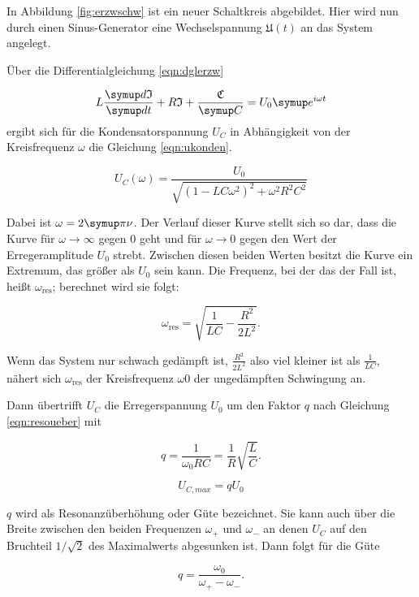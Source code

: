 In Abbildung \ref{fig:erzwschw} ist ein neuer Schaltkreis abgebildet. Hier
wird nun durch einen Sinus-Generator eine Wechselspannung  $\mathfrak{U}(t)$
an das System angelegt.

Über die Differentialgleichung \eqref{eqn:dglerzw}

\begin{equation}
  L\frac{\g{d}\mathfrak{I}}{\g{dt}} + R\mathfrak{I} + \frac{\mathfrak{C}}{\g{C}}
   = U_{\text{0}}\g{e}^{i\omega t}
  \label{eqn:dglerzw}
\end{equation}
ergibt sich für die Kondensatorspannung $U_C$ in Abhängigkeit von der
Kreisfrequenz $\omega$ die Gleichung \eqref{eqn:ukonden}.

\begin{equation}
  U_C(\omega) = \frac{U_\text{0}}{\sqrt{(1 - LC\omega^2)^2 + \omega^2
  R^2C^2}}
  \label{eqn:ukonden}
\end{equation}

Dabei ist $\omega = 2 \g{\pi} \nu$. Der Verlauf dieser Kurve stellt sich
so dar, dass die Kurve für $\omega \to \infty$ gegen 0 geht und für
$\omega \to 0$ gegen den Wert der Erregeramplitude $U_0$ strebt.
Zwischen diesen beiden Werten besitzt die Kurve ein Extremum, das
größer als $U_0$ sein kann. Die Frequenz, bei der das der Fall ist,
heißt $\omega_{\text{res}}$; berechnet wird sie folgt:

\begin{equation}
  \omega_{\text{res}} = \sqrt{\frac{1}{LC} - \frac{R^2}{2L^2}}.
\end{equation}

Wenn das System nur schwach gedämpft ist, $\frac{R^2}{2L^2}$ also viel
kleiner ist als $\frac{1}{LC}$, nähert sich $\omega_{\text{res}}$ der
Kreisfrequenz $\omega{\text{0}}$ der ungedämpften Schwingung an.

Dann übertrifft $U_C$ die Erregerspannung $U_0$ um den Faktor $q$ nach
Gleichung \eqref{eqn:resoueber} mit

\begin{equation}
  q = \frac{1}{\omega_0RC} = \frac{1}{R}\sqrt{\frac{L}{C}}.
\end{equation}

\begin{equation}
  U_{C,max} = q U_{\text{0}}
  \label{eqn:resoueber}
\end{equation}

$q$ wird als Resonanzüberhöhung oder Güte bezeichnet.
Sie kann auch über die Breite zwischen den beiden Frequenzen $\omega_+$
und $\omega_-$ an denen $U_C$ auf den Bruchteil $1/\sqrt{2}$ des
Maximalwerts abgesunken ist. Dann folgt für die Güte

\begin{equation}
  q = \frac{\omega_{\text{0}}}{\omega_+ - \omega_-}.
\end{equation}
